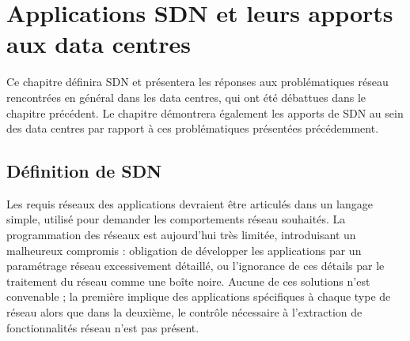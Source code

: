
\chapter{Applications SDN et leurs apports aux data centres}

Ce chapitre définira SDN et présentera les réponses aux problématiques réseau rencontrées en général dans les data centres, qui ont été débattues dans le chapitre précédent. %
Le chapitre démontrera également les apports de SDN au sein des data centres par rapport à ces problématiques présentées précédemment.

\section{Définition de SDN}

Les requis réseaux des applications devraient être articulés dans un langage simple, utilisé pour demander les comportements réseau souhaités. La  programmation des réseaux est aujourd'hui très limitée, introduisant un malheureux compromis : obligation de développer les applications par un paramétrage réseau excessivement détaillé, ou l'ignorance de ces détails par le traitement du réseau comme une boîte noire.
Aucune de ces solutions n'est convenable ; la première implique des applications spécifiques à chaque type de réseau alors que dans la deuxième, le contrôle nécessaire à l'extraction de fonctionnalités réseau n'est pas présent. 

